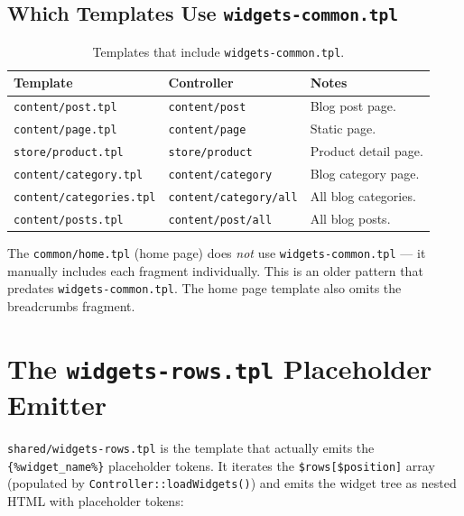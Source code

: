 \documentclass[11pt,a4paper]{article}
\begin{document}
\subsection{Which Templates Use \texttt{widgets-common.tpl}}

\begin{table}[htbp]
\centering
\caption{Templates that include \texttt{widgets-common.tpl}.}\label{tab:common-users}
\small
\begin{tabularx}{\columnwidth}{llX}
\toprule
\textbf{Template} & \textbf{Controller} & \textbf{Notes} \\
\midrule
\texttt{content/post.tpl}     & \texttt{content/post}     & Blog post page. \\
\texttt{content/page.tpl}     & \texttt{content/page}     & Static page. \\
\texttt{store/product.tpl}    & \texttt{store/product}    & Product detail page. \\
\texttt{content/category.tpl} & \texttt{content/category} & Blog category page. \\
\texttt{content/categories.tpl} & \texttt{content/category/all} & All blog categories. \\
\texttt{content/posts.tpl}    & \texttt{content/post/all} & All blog posts. \\
\bottomrule
\end{tabularx}
\end{table}

The \texttt{common/home.tpl} (home page) does \emph{not} use
\texttt{widgets-common.tpl} --- it manually includes each fragment
individually. This is an older pattern that predates
\texttt{widgets-common.tpl}. The home page template also omits the
breadcrumbs fragment.

\section{The \texttt{widgets-rows.tpl} Placeholder Emitter}\label{sec:widgets-rows}

\texttt{shared/widgets-rows.tpl} is the template that actually emits the
\texttt{\{\%widget\_name\%\}} placeholder tokens. It iterates the
\texttt{\$rows[\$position]} array (populated by
\texttt{Controller::loadWidgets()}) and emits the widget tree as nested
HTML with placeholder tokens:
\end{document}

